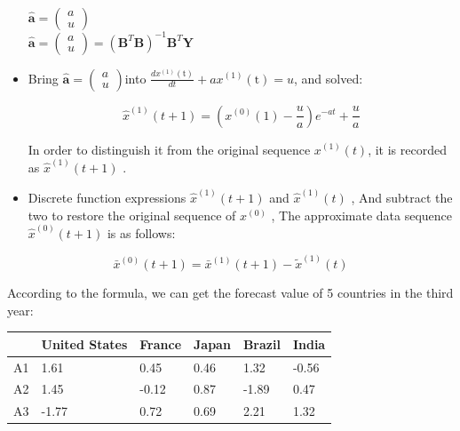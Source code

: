 \documentclass[12pt]{article}  %
\begin{document}
\begin{itemize}
\hspace{5cm} $\widehat{\mathbf{a}}=\left(\begin{array}{l}
a \\
u
\end{array}\right)$\\

\hspace{4.3cm}
$\widehat{\mathbf{a}}=\left(\begin{array}{l}
a \\
u
\end{array}\right)=\left(\mathbf{B}^{T} \mathbf{B}\right)^{-1} \mathbf{B}^{T} \mathbf{Y}$

\item Bring  $\widehat{\mathbf{a}}=\left(\begin{array}{l}
a \\
u
\end{array}\right)$into $\frac{d x^{(1)}(\mathrm{t})}{d t}+a x^{(1)}(\mathrm{t})=u$, and solved:

\begin{equation}\hat{x}^{(1)}(t+1)=\left(x^{(0)}(1)-\frac{u}{a}\right) e^{-a t}+\frac{u}{a}\end{equation}

In order to distinguish it from the original sequence $x^{(1)}(t)$, it is recorded as $\hat{x}^{(1)}(t+1)$ .

\item  Discrete function expressions  $\hat{x}^{(1)}(t+1)$ and $\hat{x}^{(1)}(t)$ , And subtract the two to restore the original sequence of $x^{(0)}$ , The approximate data sequence  $\hat{x}^{(0)}(t+1)$ is as follows:

\end{itemize}
\begin{equation}\bar{x}^{(0)}(t+1)=\bar{x}^{(1)}(t+1)-\tilde{x}^{(1)}(t)\end{equation}

According to the formula, we can get the forecast value of 5 countries in the third year:

\begin{table}[hbt!]
\hspace{3.7cm}
\begin{tabular}{|l|l|l|l|l|l|}
\hline

   & United States & France & Japan & Brazil & India \\ \hline
A1 & 1.61          & 0.45   & 0.46  & 1.32   & -0.56 \\ \hline
A2 & 1.45          & -0.12  & 0.87  & -1.89  & 0.47  \\ \hline
A3 & -1.77         & 0.72   & 0.69  & 2.21   & 1.32  \\ \hline
\end{tabular}
\end{table}
\end{document}
